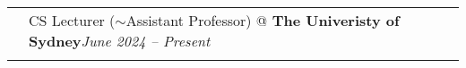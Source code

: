 \documentclass[letterpaper, 8pt]{article}
\newcommand{\corerankingAA}{\corebox{red}{30}{\xspace A* \xspace}\xspace}
\newcommand{\corerankingA}{\corebox{red}{15}{\xspace A \xspace}\xspace}
\newcommand{\tagSecurity}{\corebox{blue}{10}{Security}\xspace}
\newcommand{\tagPrivacy}{\corebox{green}{10}{Privacy}\xspace}
\begin{document}
\begin{longtable}{p{0.5in}p{5.5in}}

\\
\color{OliveGreen}{Affiliations} 
& CS Lecturer ($\sim$Assistant Professor) @ \textbf{The Univeristy of Sydney}\hfill \textit{June 2024 -- Present} \\
& \\






\end{longtable}
\end{document}

